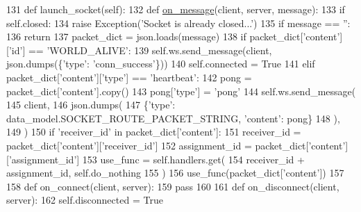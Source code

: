 \begin{DoxyCode}
131     \textcolor{keyword}{def }launch\_socket(self):
132         \textcolor{keyword}{def }\hyperlink{namespaceparlai_1_1chat__service_1_1services_1_1browser__chat_1_1client_a01c1536b48e2f5badd2fe58ea02b9a5c}{on\_message}(client, server, message):
133             \textcolor{keywordflow}{if} self.closed:
134                 \textcolor{keywordflow}{raise} Exception(\textcolor{stringliteral}{'Socket is already closed...'})
135             \textcolor{keywordflow}{if} message == \textcolor{stringliteral}{''}:
136                 \textcolor{keywordflow}{return}
137             packet\_dict = json.loads(message)
138             \textcolor{keywordflow}{if} packet\_dict[\textcolor{stringliteral}{'content'}][\textcolor{stringliteral}{'id'}] == \textcolor{stringliteral}{'WORLD\_ALIVE'}:
139                 self.ws.send\_message(client, json.dumps(\{\textcolor{stringliteral}{'type'}: \textcolor{stringliteral}{'conn\_success'}\}))
140                 self.connected = \textcolor{keyword}{True}
141             \textcolor{keywordflow}{elif} packet\_dict[\textcolor{stringliteral}{'content'}][\textcolor{stringliteral}{'type'}] == \textcolor{stringliteral}{'heartbeat'}:
142                 pong = packet\_dict[\textcolor{stringliteral}{'content'}].copy()
143                 pong[\textcolor{stringliteral}{'type'}] = \textcolor{stringliteral}{'pong'}
144                 self.ws.send\_message(
145                     client,
146                     json.dumps(
147                         \{\textcolor{stringliteral}{'type'}: data\_model.SOCKET\_ROUTE\_PACKET\_STRING, \textcolor{stringliteral}{'content'}: pong\}
148                     ),
149                 )
150             \textcolor{keywordflow}{if} \textcolor{stringliteral}{'receiver\_id'} \textcolor{keywordflow}{in} packet\_dict[\textcolor{stringliteral}{'content'}]:
151                 receiver\_id = packet\_dict[\textcolor{stringliteral}{'content'}][\textcolor{stringliteral}{'receiver\_id'}]
152                 assignment\_id = packet\_dict[\textcolor{stringliteral}{'content'}][\textcolor{stringliteral}{'assignment\_id'}]
153                 use\_func = self.handlers.get(
154                     receiver\_id + assignment\_id, self.do\_nothing
155                 )
156                 use\_func(packet\_dict[\textcolor{stringliteral}{'content'}])
157 
158         \textcolor{keyword}{def }on\_connect(client, server):
159             \textcolor{keywordflow}{pass}
160 
161         \textcolor{keyword}{def }on\_disconnect(client, server):
162             self.disconnected = \textcolor{keyword}{True}

\end{DoxyCode}
